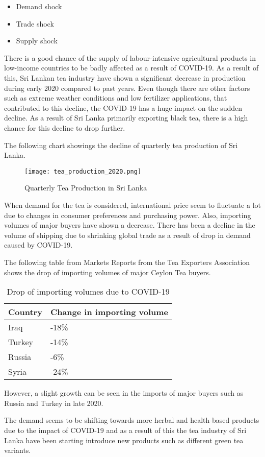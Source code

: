 \documentclass[12pt]{report}
\begin{document}
\begin{itemize}
	\item {Demand shock}
	\item {Trade shock}
	\item {Supply shock}
\end{itemize}

There is a good chance of the supply of labour-intensive agricultural products in low-income countries to be badly affected as a result of COVID-19. As a result of this, Sri Lankan tea industry have shown a significant decrease in production during early 2020 compared to past years. Even though there are other factors such as extreme weather conditions and low fertilizer applications, that contributed to this decline, the COVID-19 has a huge impact on the sudden decline. As a result of Sri Lanka primarily exporting black tea, there is a high chance for this decline to drop further.

The following chart showings the decline of quarterly tea production of Sri Lanka.
\begin{figure}[H]
	\centering
	\texttt{[image: tea\_production\_2020.png]}
	\caption{Quarterly Tea Production in Sri Lanka}
\end{figure}

When demand for the tea is considered, international price seem to fluctuate a lot due to changes in consumer preferences and purchasing power. Also, importing volumes of major buyers have shown a decrease. There has been a decline in the volume of shipping due to shrinking global trade as a result of drop in demand caused by COVID-19.

The following table from Markets Reports from the Tea Exporters Association shows the drop of importing volumes of major Ceylon Tea buyers.

\begin{table}[H]
	\centering
	\begin{tabular}{ |p{4cm}|p{6cm}| }
		\hline
		\bf{Country} & \bf{Change in importing volume} \\
		\hline
		Iraq         & -18\%                           \\
		Turkey       & -14\%                           \\
		Russia       & -6\%                            \\
		Syria        & -24\%                           \\
		\hline
	\end{tabular}
	\caption{Drop of importing volumes due to COVID-19}
\end{table}

However, a slight growth can be seen in the imports of major buyers such as Russia and Turkey in late 2020.

The demand seems to be shifting towards more herbal and health-based products due to the impact of COVID-19 and as a result of this the tea industry of Sri Lanka have been starting introduce new products such as different green tea variants.
\end{document}
